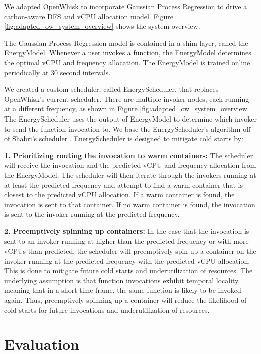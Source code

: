 \documentclass[times, 10pt,twocolumn]{article}
\begin{document}
We adapted OpenWhisk to incorporate Gaussian Process Regression to drive a carbon-aware DFS and vCPU allocation model. Figure \ref{fig:adapted_ow_system_overview} shows the system overview.

The Gaussian Process Regression model is contained in a shim layer, called the EnergyModel. Whenever a user invokes a function, the EnergyModel determines the optimal vCPU and frequency allocation. The EnergyModel is trained online periodically at 30 second intervals.

We created a custom scheduler, called EnergyScheduler, that replaces OpenWhisk's current scheduler. There are multiple invoker nodes, each running at a different frequency, as shown in Figure \ref{fig:adapted_ow_system_overview}. The EnergyScheduler uses the output of EnergyModel to determine which invoker to send the function invocation to. We base the EnergyScheduler's algorithm off of Shabri's scheduler \cite{sinha2024shabari}. EnergyScheduler is designed to mitigate cold starts by:

\textbf{1. Prioritizing routing the invocation to warm containers: } The scheduler will receive the invocation and the predicted vCPU and frequency allocation from the EnergyModel. The scheduler will then iterate through the invokers running at at least the predicted frequency and attempt to find a warm container that is closest to the predicted vCPU allocation. If a warm container is found, the invocation is sent to that container. If no warm container is found, the invocation is sent to the invoker running at the predicted frequency.

\textbf{2. Preemptively spinning up containers: } In the case that the invocation is sent to an invoker running at higher than the predicted frequency or with more vCPUs than predicted, the scheduler will preemptively spin up a container on the invoker running at the predicted frequency with the predicted vCPU allocation. This is done to mitigate future cold starts and underutilization of resources. The underlying assumption is that function invocations exhibit temporal locality, meaning that in a short time frame, the same function is likely to be invoked again. Thus, preemptively spinning up a container will reduce the likelihood of cold starts for future invocations and underutilization of resources.

\section{Evaluation}
\end{document}
